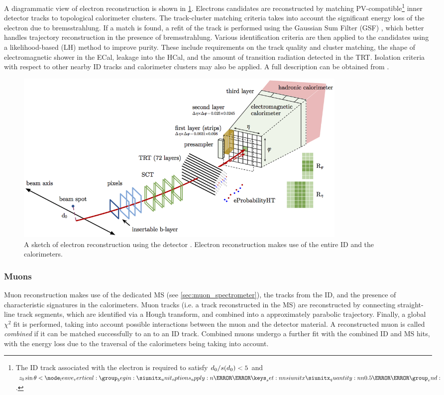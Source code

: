 A diagrammatic view of electron reconstruction is shown in \cref{fig:electron_Reco}.
Electrons candidates are reconstructed by matching PV-compatible\footnote{The ID track associated with the electron is required to satisfy $d_{0} / s(d_0) < 5$ and $\zzero\sin\theta < \SI{0.5}{\milli\meter}$.} inner detector tracks to topological calorimeter clusters.
The track-cluster matching criteria takes into account the significant energy loss of the electron due to bremsstrahlung.
If a match is found, a refit of the track is performed using the Gaussian Sum Filter (GSF) \cite{ATLAS-CONF-2012-047}, which better handles trajectory reconstruction in the presence of bremsstrahlung.
Various identification criteria are then applied to the candidates using a likelihood-based (LH) method to improve purity.
These include requirements on the track quality and cluster matching, the shape of electromagnetic shower in the ECal, leakage into the HCal, and the amount of transition radiation detected in the TRT.
Isolation criteria with respect to other nearby ID tracks and calorimeter clusters may also be applied.
A full description can be obtained from .
%
\begin{figure}[!htbp]
  \centering
  \includegraphics[width=0.8\textwidth]{chapters/2.detector/figs/electron_reco.png}
  \caption{
    A sketch of electron reconstruction using the \ATLAS detector \cite{ATLAS-CONF-2016-024}.
    Electron reconstruction makes use of the entire ID and the calorimeters.
  }
  \label{fig:electron_Reco}
\end{figure}
%


\subsubsection{Muons}
Muon reconstruction makes use of the dedicated MS (see \cref{sec:muon_spectrometer}), the tracks from the ID, and the presence of characteristic signatures in the calorimeters.
Muon tracks (i.e. a track reconstructed in the MS) are reconstructed by connecting straight-line track segments, which are identified via a Hough transform, and combined into a approximately parabolic trajectory.
Finally, a global $\chi^2$ fit is performed, taking into account possible interactions between the muon and the detector material.
A reconstructed muon is called \textit{combined} if it can be matched successfully to an to an ID track.
Combined muons undergo a further fit with the combined ID and MS hits, with the energy loss due to the traversal of the calorimeters being taking into account.

